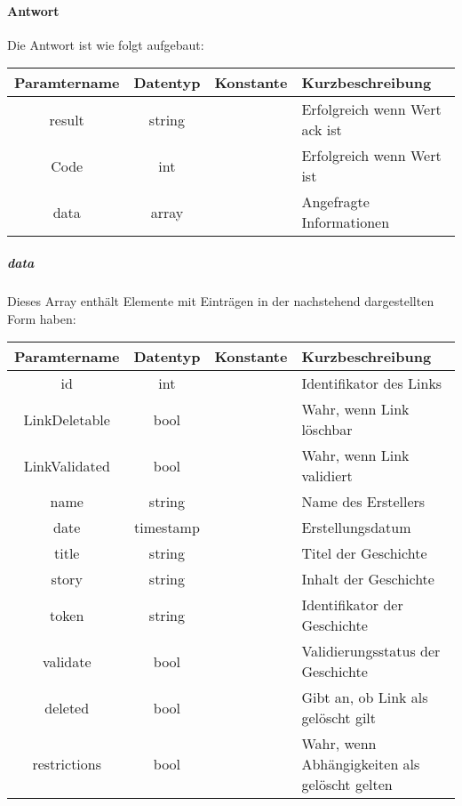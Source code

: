 \paragraph{Antwort}Die Antwort ist wie folgt aufgebaut:
\begin{table}[H]
	\begin{tabular}{|c|c|c|p{6.5cm}|}
		\hline
		\textbf{Paramtername} & \textbf{Datentyp} & \textbf{Konstante} & \textbf{Kurzbeschreibung}                                                                                               \\ \hline
		result              & string           &                 & Erfolgreich wenn Wert {\glqq ack\grqq} ist \\ \hline
		Code                & int              &                 & Erfolgreich wenn Wert {\glqq 0\grqq} ist \\ \hline
		data                & array            &                 & Angefragte Informationen \\ \hline
	\end{tabular}
\end{table}
\subparagraph{data}Dieses Array enthält Elemente mit Einträgen in der nachstehend dargestellten Form haben:
\begin{table}[H]
	\begin{tabular}{|c|c|c|p{6.5cm}|}
		\hline
		\textbf{Paramtername} & \textbf{Datentyp} & \textbf{Konstante} & \textbf{Kurzbeschreibung}    \\ \hline
		id                     & int             &                 & Identifikator des Links \\ \hline
		LinkDeletable          & bool            &                 & Wahr, wenn Link löschbar \\ \hline
		LinkValidated          & bool            &                 & Wahr, wenn Link validiert \\ \hline
		name                   & string          &                 & Name des Erstellers \\ \hline
		date                   & timestamp       &                 & Erstellungsdatum \\ \hline
		title                  & string          &                 & Titel der Geschichte \\ \hline
		story                  & string          &                 & Inhalt der Geschichte \\ \hline
		token                  & string          &                 & Identifikator der Geschichte \\ \hline
		validate               & bool            &                 & Validierungsstatus der Geschichte \\ \hline
		deleted                & bool            &                 & Gibt an, ob Link als gelöscht gilt \\ \hline
		restrictions           & bool            &                 & Wahr, wenn Abhängigkeiten als gelöscht gelten \\ \hline
	\end{tabular}
\end{table}

